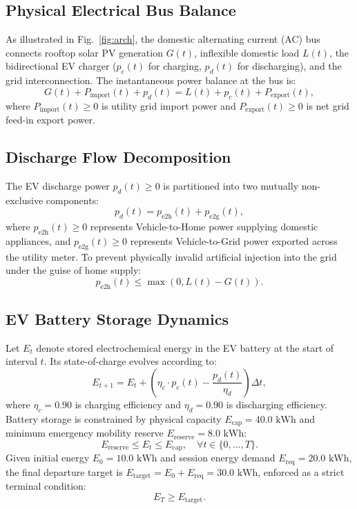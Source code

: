 \documentclass[conference]{IEEEtran}
\begin{document}
\subsection{Physical Electrical Bus Balance}
As illustrated in Fig.~\ref{fig:arch}, the domestic alternating current (AC) bus connects rooftop solar PV generation $G(t)$, inflexible domestic load $L(t)$, the bidirectional EV charger ($p_c(t)$ for charging, $p_d(t)$ for discharging), and the grid interconnection. The instantaneous power balance at the bus is:
\begin{equation}
G(t) + P_{\text{import}}(t) + p_d(t) = L(t) + p_c(t) + P_{\text{export}}(t),
\end{equation}
where $P_{\text{import}}(t) \ge 0$ is utility grid import power and $P_{\text{export}}(t) \ge 0$ is net grid feed-in export power.

\subsection{Discharge Flow Decomposition}
The EV discharge power $p_d(t) \ge 0$ is partitioned into two mutually non-exclusive components:
\begin{equation}
p_d(t) = p_{\text{e2h}}(t) + p_{\text{e2g}}(t),
\end{equation}
where $p_{\text{e2h}}(t) \ge 0$ represents Vehicle-to-Home power supplying domestic appliances, and $p_{\text{e2g}}(t) \ge 0$ represents Vehicle-to-Grid power exported across the utility meter. To prevent physically invalid artificial injection into the grid under the guise of home supply:
\begin{equation}
p_{\text{e2h}}(t) \le \max(0, L(t) - G(t)).
\end{equation}

\subsection{EV Battery Storage Dynamics}
Let $E_t$ denote stored electrochemical energy in the EV battery at the start of interval $t$. Its state-of-charge evolves according to:
\begin{equation}
E_{t+1} = E_t + \left( \eta_c \cdot p_c(t) - \frac{p_d(t)}{\eta_d} \right) \Delta t,
\end{equation}
where $\eta_c = 0.90$ is charging efficiency and $\eta_d = 0.90$ is discharging efficiency. Battery storage is constrained by physical capacity $E_{\text{cap}} = 40.0\text{ kWh}$ and minimum emergency mobility reserve $E_{\text{reserve}} = 8.0\text{ kWh}$:
\begin{equation}
E_{\text{reserve}} \le E_t \le E_{\text{cap}}, \quad \forall t \in \{0, \dots, T\}.
\end{equation}
Given initial energy $E_0 = 10.0\text{ kWh}$ and session energy demand $E_{\text{req}} = 20.0\text{ kWh}$, the final departure target is $E_{\text{target}} = E_0 + E_{\text{req}} = 30.0\text{ kWh}$, enforced as a strict terminal condition:
\begin{equation}
E_T \ge E_{\text{target}}.
\end{equation}
\end{document}

